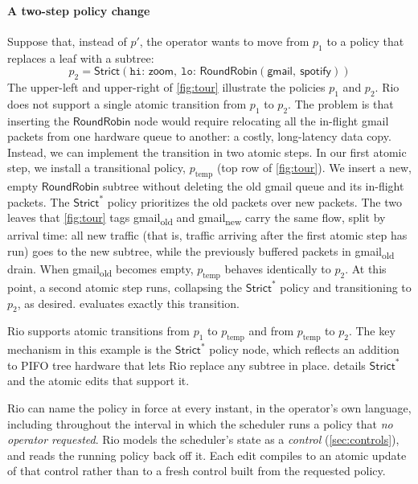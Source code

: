 \documentclass[sigplan,anonymous,review,nonacm]{acmart}
\newcommand{\Strict}{\textsf{Strict}}
\newcommand{\Strictstar}{\textsf{Strict}^{*}}
\newcommand{\RR}{\textsf{RoundRobin}}
\begin{document}
\paragraph{A two-step policy change}

Suppose that, instead of $p'$, the operator wants to move from $p_1$ to a policy that replaces a leaf with a subtree:
%
\[ p_2 = \Strict(\mathtt{hi}{:}\,\textsf{zoom},\ \mathtt{lo}{:}\,\RR(\textsf{gmail},\allowbreak\ \textsf{spotify})) \]
%
The upper-left and upper-right of \cref{fig:tour} illustrate the policies $p_1$ and $p_2$.
%
Rio does not support a single atomic transition from $p_1$ to $p_2$.
The problem is that inserting the $\RR$ node would require relocating all the in-flight \textsf{gmail} packets from one hardware queue to another:
a costly, long-latency data copy.
Instead, we can implement the transition in two atomic steps.
In our first atomic step, we install a transitional policy, $p_\text{temp}$ (top row of \cref{fig:tour}).
We insert a new, empty $\RR$ subtree
without deleting the old \textsf{gmail} queue and its in-flight packets.
The $\Strictstar$ policy prioritizes the old packets over new packets.
The two leaves that \cref{fig:tour} tags \textsf{gmail}\textsubscript{old} and \textsf{gmail}\textsubscript{new} carry the same flow, split by arrival time: all new traffic (that is, traffic arriving after the first atomic step has run) goes to the new subtree, while the previously buffered packets in \textsf{gmail}\textsubscript{old} drain.
When \textsf{gmail}\textsubscript{old} becomes empty, $p_\text{temp}$ behaves identically to $p_2$.
At this point, a second atomic step runs, collapsing the $\Strictstar$ policy and transitioning to $p_2$, as desired.
 evaluates exactly this transition.

Rio supports atomic transitions from $p_1$ to $p_\text{temp}$ and from $p_\text{temp}$ to $p_2$.
The key mechanism in this example is the $\Strictstar$ policy node, which reflects an addition to PIFO tree hardware that lets Rio replace any subtree in place.
 details $\Strictstar$ and the atomic edits that support it.

Rio can name the policy in force at every instant, in the operator's own language, including throughout the interval in which the scheduler runs a policy that \emph{no operator requested}.
Rio models the scheduler's state as a \emph{control} (\cref{sec:controls}), and reads the running policy back off it.
Each edit compiles to an atomic update of that control rather than to a fresh control built from the requested policy.
\end{document}
